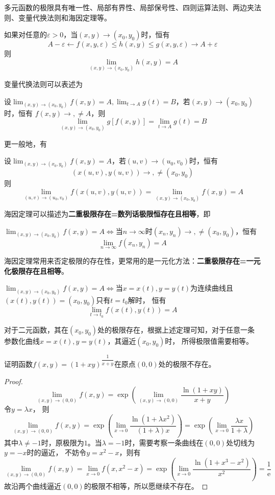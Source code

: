 多元函数的极限具有唯一性、局部有界性、局部保号性、四则运算法则、两边夹法则、变量代换法则和海因定理等。

\begin{theorem}
    如果对任意的$\varepsilon>0$，当$(x,y)\to(x_0,y_0)$时，恒有
    \[ A-\varepsilon \leftarrow f(x,y,\varepsilon) \leq h(x,y)\leq g(x,y,\varepsilon) \to A + \varepsilon \]
    则
    \[ \lim_{(x,y)\to(x_0,y_0)} h(x,y) = A \]
\end{theorem}

变量代换法则可以表述为
\begin{theorem}
    设$\lim_{(x,y)\to(x_0,y_0)} f(x,y) = A, \lim_{t\to A} g(t) = B$，若$(x,y)\to(x_0,y_0)$时，恒有
    $f(x,y)\to,\neq A$，则
    \[ \lim_{(x,y)\to(x_0,y_0)} g[f(x,y)] = \lim_{t\to A}g(t) = B \]
\end{theorem}
更一般地，有
\begin{theorem}
    设$\lim_{(x,y)\to(x_0,y_0)} f(x,y) = A$，若$(u,v)\to(u_0,v_0)$时，恒有
    \[ (x(u,v),y(u,v))\to,\neq(x_0,y_0) \]
    则
    \[ \lim_{(u,v)\to(u_0,v_0)}f(x(u,v),y(u,v)) = \lim_{(x,y)\to(x_0,y_0)} f(x,y) = A \]
\end{theorem}

海因定理可以描述为\textbf{\textsf{二重极限存在=数列话极限恒存在且相等}}，即
\begin{theorem}
    $\lim_{(x,y)\to(x_0,y_0)}f(x,y) = A \iff $当$n\to\infty$时$(x_n,y_n)\to,\neq(x_0,y_0)$，恒有
    \[ \lim_{n\to\infty} f(x_n,y_n) = A \]
\end{theorem}
\begin{situation}
    海因定理常用来否定极限的存在性，更常用的是一元化方法：\textbf{\textsf{二重极限存在=一元化极限存在且相等}}。
\end{situation}
\begin{theorem}
    $\lim_{(x,y)\to(x_0,y_0)}f(x,y) = A \iff $当$x=x(t),y=y(t)$为连续曲线且$(x(t),y(t))=(x_0,y_0)$只有$t=t_0$解时，
    恒有
    \[ \lim_{t\to t_0}f(x(t),y(t)) = A \]
\end{theorem}

对于二元函数，其在$(x_0,y_0)$处的极限存在，根据上述定理可知，对于任意一条参数化曲线$x=x(t),y=y(t)$，其逼近$(x_0,y_0)$时，
所得极限值需要相等。

\begin{example}
    证明函数$f(x,y)=(1+xy)^{\dfrac{1}{x+y}}$在原点$(0,0)$处的极限不存在。
\end{example}
\begin{proof}
    \[ \lim_{(x,y)\to(0,0)}f(x,y) = \exp\left(\lim_{(x,y)\to(0,0)}\frac{\ln(1+xy)}{x+y}\right) \]
    令$y=\lambda x$，
    则
    \[
        \lim_{(x,y)\to(0,0)}f(x,y)
        = \exp\left(\lim_{x\to 0}\frac{\ln(1+\lambda x^2)}{(1+\lambda)x}\right)
        = \exp\left(\lim_{x\to 0}\frac{\lambda x}{1+\lambda}\right)
    \]
    其中$\lambda \neq -1$时，原极限为$1$。当$\lambda = -1$时，需要考察一条曲线在$(0,0)$处切线为$y=-x$时的逼近，
    不妨令$y=x^2-x$，则有
    \[
        \lim_{(x,y)\to(0,0)}f(x,y)
        = \lim_{x\to 0} f(x,x^2-x)
        = \exp\left(\lim_{x\to 0}\frac{\ln(1+x^3-x^2)}{x^2}\right)
        = \frac{1}{\mathrm{e}}
    \]
    故沿两个曲线逼近$(0,0)$的极限不相等，所以愿继续不存在。
\end{proof}

